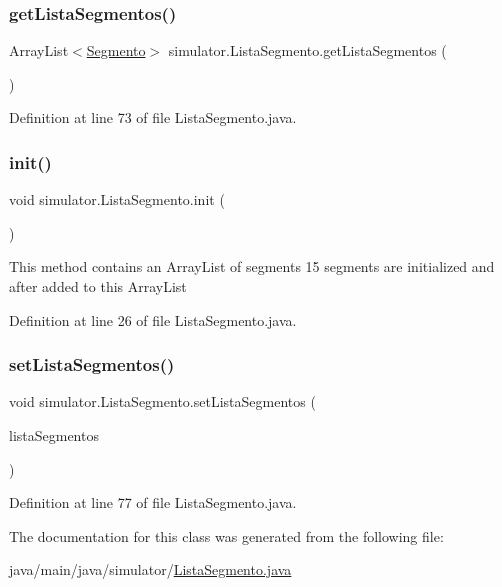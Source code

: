\subsubsection{\texorpdfstring{get\+Lista\+Segmentos()}{getListaSegmentos()}}
{\footnotesize\ttfamily Array\+List$<$\mbox{\hyperlink{classsimulator_1_1_segmento}{Segmento}}$>$ simulator.\+Lista\+Segmento.\+get\+Lista\+Segmentos (\begin{DoxyParamCaption}{ }\end{DoxyParamCaption})}



Definition at line 73 of file Lista\+Segmento.\+java.

\mbox{\label{classsimulator_1_1_lista_segmento_a92b11e2e8cfcf09d45146e9771f87dea}} 
\subsubsection{\texorpdfstring{init()}{init()}}
{\footnotesize\ttfamily void simulator.\+Lista\+Segmento.\+init (\begin{DoxyParamCaption}{ }\end{DoxyParamCaption})}

This method contains an Array\+List of segments 15 segments are initialized and after added to this Array\+List 

Definition at line 26 of file Lista\+Segmento.\+java.

\mbox{\label{classsimulator_1_1_lista_segmento_a029655e5d0c31702beeba7834d024c43}} 
\subsubsection{\texorpdfstring{set\+Lista\+Segmentos()}{setListaSegmentos()}}
{\footnotesize\ttfamily void simulator.\+Lista\+Segmento.\+set\+Lista\+Segmentos (\begin{DoxyParamCaption}\item[{Array\+List$<$ \mbox{\hyperlink{classsimulator_1_1_segmento}{Segmento}} $>$}]{lista\+Segmentos }\end{DoxyParamCaption})}



Definition at line 77 of file Lista\+Segmento.\+java.



The documentation for this class was generated from the following file\+:\begin{DoxyCompactItemize}
\item 
java/main/java/simulator/\mbox{\hyperlink{_lista_segmento_8java}{Lista\+Segmento.\+java}}\end{DoxyCompactItemize}
